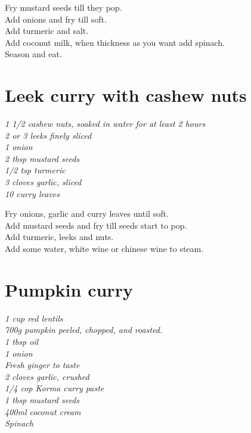 \documentclass{tufte-book}
\begin{document}
\smallskip
Fry mustard seeds till they pop.
\\Add onions and fry till soft.
\\Add turmeric and salt.
\\Add coconut milk, when thickness as you want add spinach.
\\Season and eat.


\section{Leek curry with cashew nuts}
\emph{1 1/2 cashew nuts, soaked in water for at least 2 hours
\\2 or 3 leeks finely sliced
\\1 onion
\\2 tbsp mustard seeds
\\1/2 tsp turmeric
\\3 cloves garlic, sliced
\\10 curry leaves
}

\smallskip
Fry onions, garlic and curry leaves until soft.
\\Add mustard seeds and fry till seeds start to pop.
\\Add turmeric, leeks and nuts.
\\Add some water, white wine or chinese wine to steam.


\section{Pumpkin curry}
\emph{1 cup red lentils
\\700g pumpkin peeled, chopped, and roasted.
\\1 tbsp oil
\\1 onion
\\Fresh ginger to taste
\\2 cloves garlic, crushed
\\1/4 cop Korma curry paste
\\1 tbsp mustard seeds
\\400ml coconut cream
\\Spinach{}}
\end{document}
